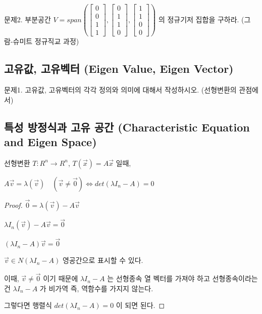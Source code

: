 문제2. 부분공간 $V = span(\begin{bmatrix}0 \\ 0 \\ 1 \\ 1 \end{bmatrix}, \begin{bmatrix}0 \\ 1 \\ 1 \\ 0 \end{bmatrix}, \begin{bmatrix}1 \\ 1 \\ 0 \\ 0 \end{bmatrix})$ 의 정규기저 집합을 구하라. (그람-슈미트 정규직교 과정)

\newpage
\subsection{고유값, 고유벡터 (Eigen Value, Eigen Vector)}
\begin{theorem}

\end{theorem}

\newpage
문제1. 고유값, 고유벡터의 각각 정의와 의미에 대해서 작성하시오. (선형변환의 관점에서)
\newpage
\subsection{특성 방정식과 고유 공간 (Characteristic Equation and Eigen Space)}
\begin{theorem}
선형변환 $T: R^n \rightarrow R^n$,   $T(\vec{x}) = A\vec{x}$ 일때,

$A\vec{v} = \lambda(\vec{v}) \quad (\vec{v} \neq \vec{0}) \iff det(\lambda I_n - A) = 0$
\end{theorem}

\begin{proof}
$\vec{0} = \lambda(\vec{v}) - A\vec{v}$

$\lambda I_n (\vec{v}) - A\vec{v} = \vec{0}$

$(\lambda I_n - A)\vec{v} = \vec{0}$

$\vec{v} \in N(\lambda I_n - A)$  영공간으로 표시할 수 있다.

이때, $\vec{v} \neq \vec{0}$ 이기 때문에 $\lambda I_n - A$ 는 선형종속 열 벡터를 가져야 하고 선형종속이라는 건 $\lambda I_n - A$ 가 비가역 즉, 역함수를 가지지 않는다.

그렇다면 행렬식 $det(\lambda I_n - A) = 0$ 이 되면 된다.
\end{proof}


